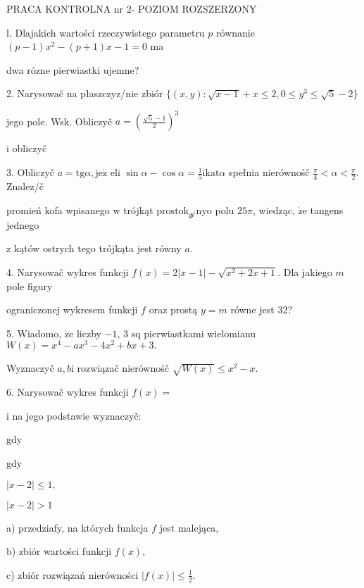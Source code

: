 \documentclass[a4paper,12pt]{article}
\begin{document}
PRACA KONTROLNA nr 2- POZIOM ROZSZERZONY

l. Dlajakich wartości rzeczywistego parametru $p$ równanie $(p-1)x^{2}-(p+1)x-1=0$ ma

dwa rózne pierwiastki ujemne?

2. Narysowač na płaszczyz/nie zbiór $\{(x,y):\sqrt{x-1}+x\leq 2,0\leq y^{3}\leq\sqrt{5}-2\}$

jego pole. Wsk. Obliczyč $a=(\displaystyle \frac{\sqrt{5}-1}{2})^{3}$

i obliczyč

3. Obliczyč $a=\mathrm{t}\mathrm{g}\alpha, \mathrm{j}\mathrm{e}\dot{\mathrm{z}}$ eli $\displaystyle \sin\alpha-\cos\alpha=\frac{1}{5}\mathrm{i}\mathrm{k}\mathrm{a}\mathrm{t}\alpha$ spełnia nierównośč $\displaystyle \frac{\pi}{4}<\alpha<\frac{\pi}{2}$. Znalez/č

promień kofa wpisanego $\mathrm{w}$ trójkąt $\mathrm{p}\mathrm{r}\mathrm{o}\mathrm{s}\mathrm{t}\mathrm{o}\mathrm{k}_{\Phi^{\mathrm{t}}}\mathrm{n}\mathrm{y}\mathrm{o}$ polu $ 25\pi$, wiedząc, $\dot{\mathrm{z}}\mathrm{e}$ tangens jednego

$\mathrm{z}$ kątów ostrych tego trójkąta jest równy $a.$

4. Narysowač wykres funkcji $f(x) =2|x-1|-\sqrt{x^{2}+2x+1}$. Dla jakiego $m$ pole figury

ograniczonej wykresem funkcji $f$ oraz prostą $y=m$ równe jest 32?

5. Wiadomo, $\dot{\mathrm{z}}\mathrm{e}$ liczby $-1$, 3 sq pierwiastkami wielomianu $W(x)=x^{4}-ax^{3}-4x^{2}+bx+3.$

Wyznaczyč $a, b\mathrm{i}$ rozwiązač nierównośč $\sqrt{W(x)}\leq x^{2}-x.$

6. Narysowač wykres funkcji $f(x)=$

$\mathrm{i}$ na jego podstawie wyznaczyč:

gdy

gdy

$|x-2|\leq 1,$

$|x-2|>1$

a) przedziafy, na których funkcja $f$ jest malejąca,

b) zbiór wartości funkcji $f(x),$

c) zbiór rozwiązań nierówności $|f(x)|\displaystyle \leq\frac{1}{2}.$
\end{document}
